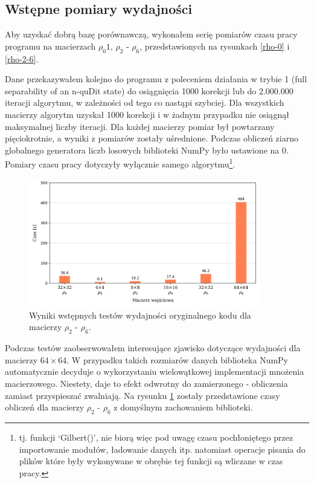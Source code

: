 \documentclass[11pt, a4paper]{article}
\begin{document}
\begin{sloppypar}
    \subsection{Wstępne pomiary wydajności}


    Aby uzyskać dobrą bazę porównawczą, wykonałem serię pomiarów czasu pracy programu na
    macierzach $\rho_{0}1$, $\rho_{2}$ - $\rho_{6}$, przedstawionych na rysunkach \ref{rho-0}
    i \ref{rho-2-6}.

    Dane przekazywałem kolejno do programu z poleceniem działania w trybie 1 (full
    separability of an n-quDit state) do osiągnięcia 1000 korekcji lub do 2.000.000
    iteracji algorytmu, w zależności od tego co nastąpi szybciej. Dla wszystkich
    macierzy algorytm uzyskał 1000 korekcji i w żadnym przypadku nie osiągnął
    maksymalnej liczby iteracji. Dla każdej macierzy pomiar był powtarzany pięciokrotnie,
    a wyniki z pomiarów zostały uśrednione. Podczas obliczeń ziarno globalnego generatora
    liczb losowych biblioteki NumPy było ustawione na 0. Pomiary czasu pracy dotyczyły wyłącznie
    samego algorytmu\footnote{tj. funkcji `Gilbert()', nie biorą więc pod uwagę czasu
    pochłoniętego przez importowanie modułów, ładowanie danych itp. natomiast operacje
    pisania do plików które były wykonywane w obrębie tej funkcji są wliczane w czas
    pracy.}.

    \FloatBarrier
    \begin{figure}[ht]
      \centering
      \includegraphics[width=0.9\textwidth]{"resources/original_performance_tests.png"}
      \caption{Wyniki wstępnych testów wydajności oryginalnego kodu dla macierzy $\rho_{2}$ - $\rho
      _{6}$.}
      \label{pre-perf}
    \end{figure}
    \FloatBarrier

    Podczas testów zaobserwowałem interesujące zjawisko dotyczące wydajności dla macierzy
    $64\times64$. W przypadku takich rozmiarów danych biblioteka NumPy automatycznie
    decyduje o wykorzystaniu wielowątkowej implementacji mnożenia macierzowego. Niestety,
    daje to efekt odwrotny do zamierzonego - obliczenia zamiast przyspieszać zwalniają. Na
    rysunku \ref{pre-perf} zostały przedstawione czasy obliczeń dla macierzy $\rho_{2}$ -
    $\rho_{6}$ z domyślnym zachowaniem biblioteki.


\end{sloppypar}
\end{document}
